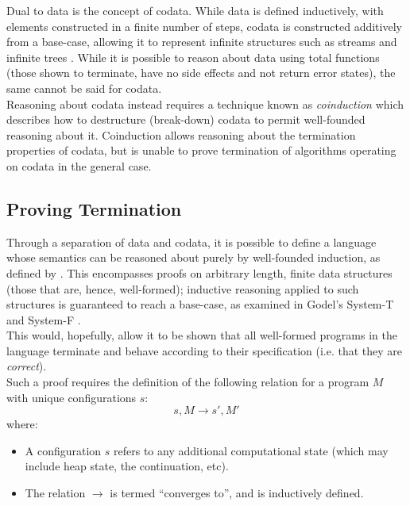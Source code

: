 Dual to data is the concept of codata.
While data is defined inductively, with elements constructed in a finite number of steps, codata is constructed additively from a base-case, allowing it to represent infinite structures such as streams and infinite trees \citep{hinze2010reasoning}.
While it is possible to reason about data using total functions (those shown to terminate, have no side effects and not return error states), the same cannot be said for codata.\\

Reasoning about codata instead requires a technique known as \textit{coinduction} which describes how to destructure (break-down) codata to permit well-founded reasoning about it. 
Coinduction allows reasoning about the termination properties of codata, but is unable to prove termination of algorithms operating on codata in the general case. 


\subsection{Proving Termination} %
\label{sub:proving_termination}
Through a separation of data and codata, it is possible to define a language whose semantics can be reasoned about purely by well-founded induction, as defined by \citet{nordstrom1988terminating}. 
This encompasses proofs on arbitrary length, finite data structures (those that are, hence, well-formed); inductive reasoning applied to such structures is guaranteed to reach a base-case, as examined in Godel's System-T and System-F \citep{alves2010godel,girard1989proofs}.\\

This would, hopefully, allow it to be shown that all well-formed programs in the language terminate and behave according to their specification (i.e. that they are \textit{correct}).\\

Such a proof requires the definition of the following relation for a program $M$ with unique configurations $s$:
\begin{equation}
    s, M \rightarrow s', M'
\end{equation}
where:
\begin{itemize}
    \item A configuration $s$ refers to any additional computational state (which may include heap state, the continuation, etc).
    \item The relation $\rightarrow$ is termed ``converges to'', and is inductively defined.
\end{itemize}

